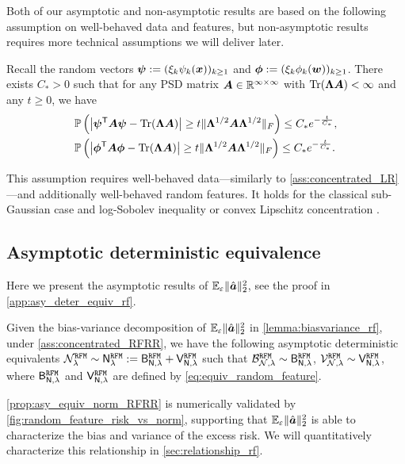 Both of our asymptotic and non-asymptotic results are based on the following assumption on well-behaved data and features, but non-asymptotic results requires more technical assumptions we will deliver later.

\begin{assumption}\label{ass:concentrated_RFRR} Recall the random vectors ${\boldsymbol \psi} := (\xi_k \psi_k({\boldsymbol x}))_{k \geq 1}$ and ${\boldsymbol \phi} := (\xi_k \phi_k({\boldsymbol w}))_{k \geq 1}$. There exists $C_* > 0$ such that for any PSD matrix ${\boldsymbol A} \in \mathbb{R}^{\infty \times \infty}$ with $\operatorname{Tr}({\boldsymbol \Lambda} {\boldsymbol A}) < \infty$ and any $t\ge0$, we have
\[
\begin{aligned}
 & \mathbb{P} \left( \left| {\boldsymbol \psi}^{\mathsf T} {\boldsymbol A} {\boldsymbol \psi} - {\rm Tr}({\boldsymbol \Lambda} {\boldsymbol A}) \right| \geq t \|{\boldsymbol \Lambda}^{1/2} {\boldsymbol A} {\boldsymbol \Lambda}^{1/2}\|_F \right) 
\leq C_*  e^{-\frac{t}{C_*}}, \\
& \mathbb{P} \left( \left| {\boldsymbol \phi}^{\mathsf T} {\boldsymbol A} {\boldsymbol \phi} - {\rm Tr}({\boldsymbol \Lambda} {\boldsymbol A}) \right| \geq t \|{\boldsymbol \Lambda}^{1/2} {\boldsymbol A} {\boldsymbol \Lambda}^{1/2}\|_F \right) 
\leq C_*  e^{-\frac{t}{C_*}}.  
\end{aligned}
\]
\end{assumption}

This assumption requires well-behaved data---similarly to \cref{ass:concentrated_LR}---and additionally well-behaved random features. It holds for the classical sub-Gaussian case and log-Sobolev inequality or convex Lipschitz concentration \citep{cheng2022dimension}.

\vspace{-0.cm}
\subsection{Asymptotic deterministic equivalence}
\label{sec:linear_asym_rf}
\vspace{-0.cm}


Here we present the asymptotic results of $\mathbb{E}_{\varepsilon}\|\hat{{\boldsymbol a}}\|_2^2$, see the proof in \cref{app:asy_deter_equiv_rf}.
\begin{proposition}\label{prop:asy_equiv_norm_RFRR}
    Given the bias-variance decomposition of $\mathbb{E}_{\varepsilon}\|\hat{{\boldsymbol a}}\|_2^2$ in \cref{lemma:biasvariance_rf}, 
    under \cref{ass:concentrated_RFRR}, we have the following asymptotic deterministic equivalents $\mathcal{N}^{\tt RFM}_\lambda \sim \mathsf N^{\tt RFM}_\lambda := \mathsf B_{\mathsf N,\lambda}^{\tt RFM} + \mathsf V_{\mathsf N,\lambda}^{\tt RFM}$ such that $\mathcal{B}^{\tt RFM}_{\mathcal{N},\lambda} \sim \mathsf B_{\mathsf N,\lambda}^{\tt RFM}$, $\mathcal{V}^{\tt RFM}_{\mathcal{N},\lambda} \sim \mathsf V_{\mathsf N,\lambda}^{\tt RFM}$, where $\mathsf B_{\mathsf N,\lambda}^{\tt RFM}$ and $\mathsf V_{\mathsf N,\lambda}^{\tt RFM}$ are defined by \cref{eq:equiv_random_feature}.
\end{proposition}
\cref{prop:asy_equiv_norm_RFRR} is numerically validated by \cref{fig:random_feature_risk_vs_norm}, supporting that $\mathbb{E}_{\varepsilon}\|\hat{{\boldsymbol a}}\|_2^2$ is able to characterize the bias and variance of the excess risk.
We will quantitatively characterize this relationship in \cref{sec:relationship_rf}.

